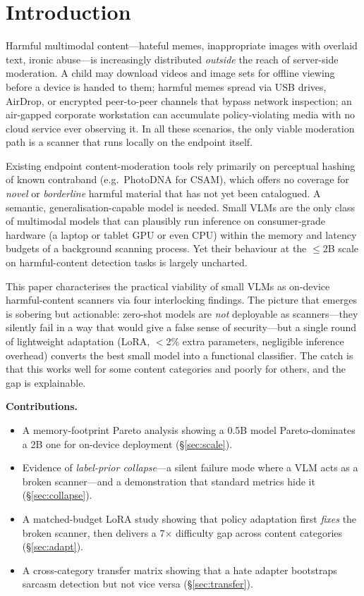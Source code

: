 \documentclass[sigconf,nonacm]{acmart}
\begin{document}
\section{Introduction}
Harmful multimodal content---hateful memes, inappropriate images with overlaid text,
ironic abuse---is increasingly distributed \emph{outside} the reach of server-side
moderation. A child may download videos and image sets for offline viewing before a device
is handed to them; harmful memes spread via USB drives, AirDrop, or encrypted peer-to-peer
channels that bypass network inspection; an air-gapped corporate workstation can accumulate
policy-violating media with no cloud service ever observing it. In all these scenarios,
the only viable moderation path is a scanner that runs locally on the endpoint itself.

Existing endpoint content-moderation tools rely primarily on perceptual hashing of known
contraband (e.g.\ PhotoDNA for CSAM), which offers no coverage for \emph{novel} or
\emph{borderline} harmful material that has not yet been catalogued. A semantic,
generalisation-capable model is needed. Small VLMs are the only class of multimodal models
that can plausibly run inference on consumer-grade hardware (a laptop or tablet GPU or
even CPU) within the memory and latency budgets of a background scanning process. Yet their
behaviour at the $\leq$2B scale on harmful-content detection tasks is largely uncharted.

This paper characterises the practical viability of small VLMs as on-device harmful-content
scanners via four interlocking findings. The picture that emerges is sobering but
actionable: zero-shot models are \emph{not} deployable as scanners---they silently fail in
a way that would give a false sense of security---but a single round of lightweight
adaptation (LoRA, $<$2\% extra parameters, negligible inference overhead) converts the best
small model into a functional classifier. The catch is that this works well for some
content categories and poorly for others, and the gap is explainable.

\noindent\textbf{Contributions.}
\begin{itemize}
\item A memory-footprint Pareto analysis showing a 0.5B model Pareto-dominates a 2B one
for on-device deployment (\S\ref{sec:scale}).
\item Evidence of \emph{label-prior collapse}---a silent failure mode where a VLM acts as
a broken scanner---and a demonstration that standard metrics hide it
(\S\ref{sec:collapse}).
\item A matched-budget LoRA study showing that policy adaptation first \emph{fixes} the
broken scanner, then delivers a 7$\times$ difficulty gap across content categories
(\S\ref{sec:adapt}).
\item A cross-category transfer matrix showing that a hate adapter bootstraps sarcasm
detection but not vice versa (\S\ref{sec:transfer}).
\end{itemize}
\end{document}
